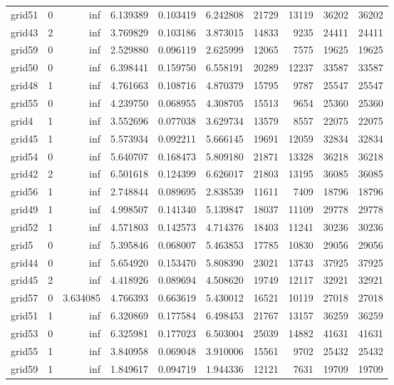 \begin{longtable}{|l|r|r|r|r|r|r|r|r|r|}
grid51 & 0 & inf & 6.139389 & 0.103419 & 6.242808 & 21729 & 13119 & 36202 & 36202 \\
grid43 & 2 & inf & 3.769829 & 0.103186 & 3.873015 & 14833 & 9235 & 24411 & 24411 \\
grid59 & 0 & inf & 2.529880 & 0.096119 & 2.625999 & 12065 & 7575 & 19625 & 19625 \\
grid50 & 0 & inf & 6.398441 & 0.159750 & 6.558191 & 20289 & 12237 & 33587 & 33587 \\
grid48 & 1 & inf & 4.761663 & 0.108716 & 4.870379 & 15795 & 9787 & 25547 & 25547 \\
grid55 & 0 & inf & 4.239750 & 0.068955 & 4.308705 & 15513 & 9654 & 25360 & 25360 \\
grid4 & 1 & inf & 3.552696 & 0.077038 & 3.629734 & 13579 & 8557 & 22075 & 22075 \\
grid45 & 1 & inf & 5.573934 & 0.092211 & 5.666145 & 19691 & 12059 & 32834 & 32834 \\
grid54 & 0 & inf & 5.640707 & 0.168473 & 5.809180 & 21871 & 13328 & 36218 & 36218 \\
grid42 & 2 & inf & 6.501618 & 0.124399 & 6.626017 & 21803 & 13195 & 36085 & 36085 \\
grid56 & 1 & inf & 2.748844 & 0.089695 & 2.838539 & 11611 & 7409 & 18796 & 18796 \\
grid49 & 1 & inf & 4.998507 & 0.141340 & 5.139847 & 18037 & 11109 & 29778 & 29778 \\
grid52 & 1 & inf & 4.571803 & 0.142573 & 4.714376 & 18403 & 11241 & 30236 & 30236 \\
grid5 & 0 & inf & 5.395846 & 0.068007 & 5.463853 & 17785 & 10830 & 29056 & 29056 \\
grid44 & 0 & inf & 5.654920 & 0.153470 & 5.808390 & 23021 & 13743 & 37925 & 37925 \\
grid45 & 2 & inf & 4.418926 & 0.089694 & 4.508620 & 19749 & 12117 & 32921 & 32921 \\
grid57 & 0 & 3.634085 & 4.766393 & 0.663619 & 5.430012 & 16521 & 10119 & 27018 & 27018 \\
grid51 & 1 & inf & 6.320869 & 0.177584 & 6.498453 & 21767 & 13157 & 36259 & 36259 \\
grid53 & 0 & inf & 6.325981 & 0.177023 & 6.503004 & 25039 & 14882 & 41631 & 41631 \\
grid55 & 1 & inf & 3.840958 & 0.069048 & 3.910006 & 15561 & 9702 & 25432 & 25432 \\
grid59 & 1 & inf & 1.849617 & 0.094719 & 1.944336 & 12121 & 7631 & 19709 & 19709 \\

\end{longtable}
